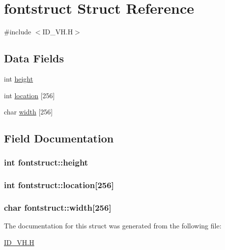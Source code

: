 \hypertarget{structfontstruct}{
\section{fontstruct Struct Reference}
\label{structfontstruct}
}


{\ttfamily \#include $<$ID\_\-VH.H$>$}

\subsection*{Data Fields}
\begin{DoxyCompactItemize}
\item 
int \hyperlink{structfontstruct_afd44ecc4c4d38e9767b524050b628995}{height}
\item 
int \hyperlink{structfontstruct_a1e1a1d2b634438b32112fca4afb46111}{location} \mbox{[}256\mbox{]}
\item 
char \hyperlink{structfontstruct_a5066a4d6c3b8ad275c4cf3e427b39e4a}{width} \mbox{[}256\mbox{]}
\end{DoxyCompactItemize}


\subsection{Field Documentation}
\hypertarget{structfontstruct_afd44ecc4c4d38e9767b524050b628995}{
\subsubsection[{height}]{\setlength{\rightskip}{0pt plus 5cm}int {\bf fontstruct::height}}}
\label{structfontstruct_afd44ecc4c4d38e9767b524050b628995}
\hypertarget{structfontstruct_a1e1a1d2b634438b32112fca4afb46111}{
\subsubsection[{location}]{\setlength{\rightskip}{0pt plus 5cm}int {\bf fontstruct::location}\mbox{[}256\mbox{]}}}
\label{structfontstruct_a1e1a1d2b634438b32112fca4afb46111}
\hypertarget{structfontstruct_a5066a4d6c3b8ad275c4cf3e427b39e4a}{
\subsubsection[{width}]{\setlength{\rightskip}{0pt plus 5cm}char {\bf fontstruct::width}\mbox{[}256\mbox{]}}}
\label{structfontstruct_a5066a4d6c3b8ad275c4cf3e427b39e4a}


The documentation for this struct was generated from the following file:\begin{DoxyCompactItemize}
\item 
\hyperlink{ID__VH_8H}{ID\_\-VH.H}\end{DoxyCompactItemize}
